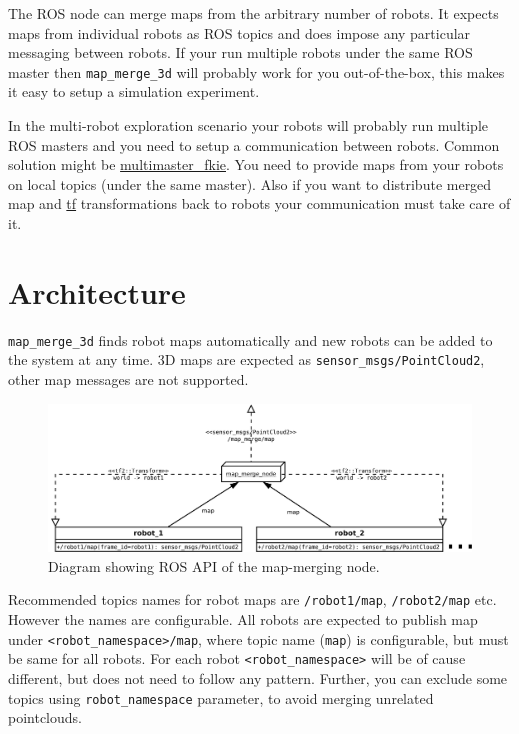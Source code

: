 The ROS node can merge maps from the arbitrary number of robots. It expects maps from individual robots as ROS topics and does impose any particular messaging between robots. If your run multiple robots under the same ROS master then \texttt{map\_merge\_3d} will probably work for you out-of-the-box, this makes it easy to setup a simulation experiment.

In the multi-robot exploration scenario your robots will probably run multiple ROS masters and you need to setup a communication between robots. Common solution might be \href{http://wiki.ros.org/multimaster_fkie}{multimaster\_fkie}. You need to provide maps from your robots on local topics (under the same master). Also if you want to distribute merged map and \href{http://wiki.ros.org/tf}{tf} transformations back to robots your communication must take care of it.

\section{Architecture}

\texttt{map\_merge\_3d} finds robot maps automatically and new robots can be added to the system at any time. 3D maps are expected as \texttt{sensor\_msgs/PointCloud2}, other map messages are not supported.

\begin{figure}
    \centering
    \includegraphics[width=\textwidth]{../img/architecture.pdf}
    \caption[The architecture of the \texttt{map\_merge\_node}]{Diagram showing \gls{ROS} \gls{API} of the map-merging node.}
    \label{fig:architecture}
\end{figure}

Recommended topics names for robot maps are \texttt{/robot1/map}, \texttt{/robot2/map} etc. However the names are configurable. All robots are expected to publish map under \texttt{<robot\_namespace>/map}, where topic name (\texttt{map}) is configurable, but must be same for all robots. For each robot \texttt{<robot\_namespace>} will be of cause different, but does not need to follow any pattern. Further, you can exclude some topics using \texttt{robot\_namespace} parameter, to avoid merging unrelated pointclouds.

